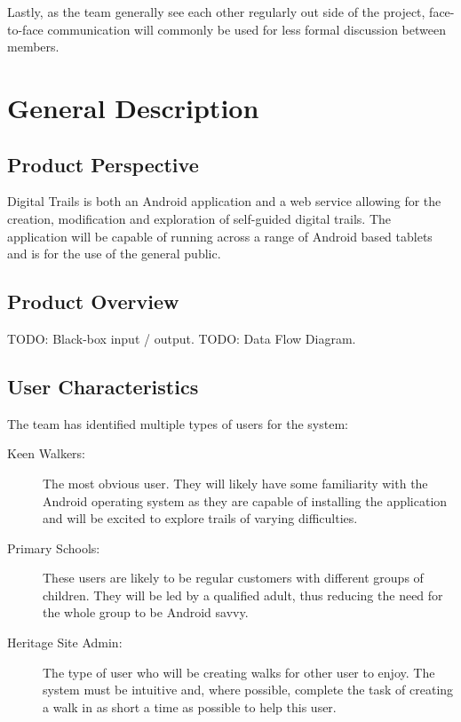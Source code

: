 \documentclass[11pt,a4paper]{article}
\begin{document}
Lastly, as the team generally see each other regularly out side of the project, face-to-face communication will commonly be used for less formal discussion between members. 

\section{General Description}
\label{sec:gen-desc}

\subsection{Product Perspective}
\label{sec:product-perspective}
Digital Trails is both an Android application and a web service allowing for the creation, modification and exploration of self-guided digital trails. The application will be capable of running across a range of Android based tablets and is for the use of the general public.

\subsection{Product Overview}
\label{sec:product-overview}
TODO: Black-box input / output.
TODO: Data Flow Diagram.

\subsection{User Characteristics}
\label{sec:user-characteristics}

The team has identified multiple types of users for the system:
\begin{description}
\item[Keen Walkers:] The most obvious user. They will likely have some familiarity with the Android operating system as they are capable of installing the application and will be excited to explore trails of varying difficulties.
\item[Primary Schools:] These users are likely to be regular customers with different groups of children. They will be led by a qualified adult, thus reducing the need for the whole group to be Android savvy.
\item[Heritage Site Admin:] The type of user who will be creating walks for other user to enjoy. The system must be intuitive and, where possible, complete the task of creating a walk in as short a time as possible to help this user.
\end{description}
\end{document}
